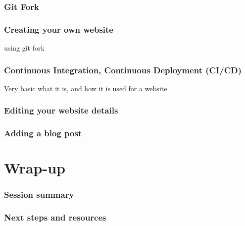 \documentclass[aspectratio=169]{beamer}
\begin{document}
    \begin{frame}
        \frametitle{Git Fork}
    
        
    
    \end{frame}

    \begin{frame}
        \frametitle{Creating your own website}
    
        using git fork
    
    \end{frame}

    \begin{frame}
        \frametitle{Continuous Integration, Continuous Deployment (CI/CD)}
    
        Very basic what it is, and how it is used for a website
    
    \end{frame}

    \begin{frame}
        \frametitle{Editing your website details}
    
        
    
    \end{frame}

    \begin{frame}
        \frametitle{Adding a blog post}
    
        
    
    \end{frame}

    \section{Wrap-up}

    \begin{frame}
        \frametitle{Session summary}
    
        
    
    \end{frame}

    \begin{frame}
        \frametitle{Next steps and resources}
    
        
    
    \end{frame}

    
\end{document}
